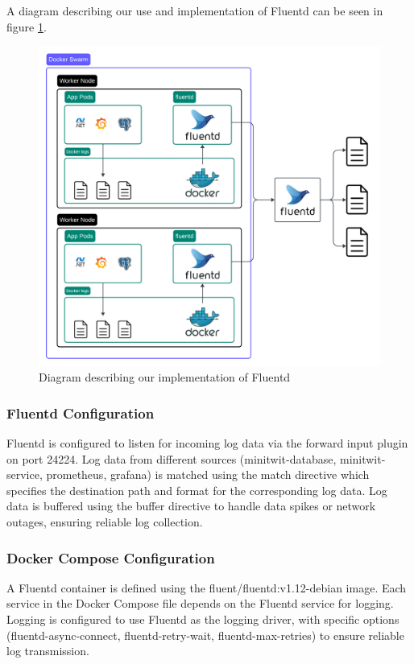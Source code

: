 A diagram describing our use and implementation of Fluentd can be seen in figure \ref{fig:logging2}.
\begin{figure}[H]
	\centering
	\includegraphics[width=1\textwidth]{Logging2.png}
	\caption{Diagram describing our implementation of Fluentd}
	\label{fig:logging2}
\end{figure}

\subsubsection*{Fluentd Configuration}

Fluentd is configured to listen for incoming log data via the forward input plugin on port 24224. 
Log data from different sources  (minitwit-database, minitwit-service, prometheus, grafana) is matched using the match directive which specifies the destination path and format for the corresponding log data. 
Log data is buffered using the buffer directive to handle data spikes or network outages, ensuring reliable log collection.

\subsubsection*{Docker Compose Configuration}

A Fluentd container is defined using the fluent/fluentd:v1.12-debian image. 
Each service in the Docker Compose file depends on the Fluentd service for logging. 
Logging is configured to use Fluentd as the logging driver, with specific options (fluentd-async-connect, fluentd-retry-wait, fluentd-max-retries) to ensure reliable log transmission. 

